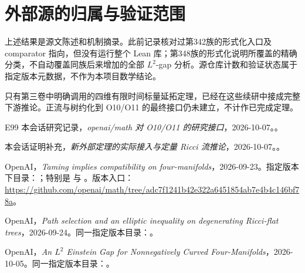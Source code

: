 \documentclass[UTF8,11pt,fontset=none]{ctexart}
\theoremstyle{definition}
\theoremstyle{remark}
\begin{document}
\section{外部源的归属与验证范围}\label{v2-ux5916ux90e8ux6e90ux7684ux5f52ux5c5eux4e0eux9a8cux8bc1ux8303ux56f4}

上述结果是源文陈述和机制摘录。此前记录核对过第342族的形式化入口及 comparator 指向，但没有运行整个 Lean 库；第348族的形式化说明所覆盖的精确分类，不自动覆盖同族后来增加的全部 \(L^2\)-gap 分析。源仓库计数和验证状态属于指定版本元数据，不作为本项目数学结论。

只有第三卷中明确调用的四维有限时间标量延拓定理，已经在这些续研中接成完整下游推论。正流与树约化到 O10/O11 的最终接口仍未建立，不计作已完成定理。

\begin{thebibliography}{E99}
\small
{} 本会话研究记录，\emph{openai/math 对 O10/O11 的研究接口}，2026-10-07。。

 本会话证明补充，\emph{新外部定理的实际接入与定量 Ricci 流推论}，2026-10-07。。

 OpenAI，\emph{Taming implies compatibility on four-manifolds}，2026-09-23。指定版本下目录：；特别是  与 。版本入口：\url{https://github.com/openai/math/tree/adc7f1241b42e322a6451854ab7e4b4c146bf78a}。

 OpenAI，\emph{Path selection and an elliptic inequality on degenerating Ricci-flat trees}，2026-09-24。同一指定版本目录：。

 OpenAI，\emph{An \(L^2\) Einstein Gap for Nonnegatively Curved Four-Manifolds}，2026-10-05。同一指定版本目录：。

\end{thebibliography}
\end{document}
